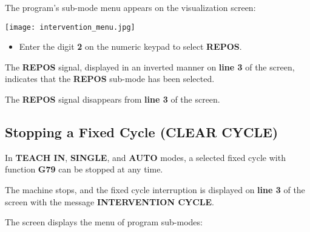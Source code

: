 \begin{itemize}
\end{itemize}

The program's sub-mode menu appears on the visualization screen:

\begin{center}
    \texttt{[image: intervention\_menu.jpg]}
\end{center}

\begin{itemize}
    \item Enter the digit \textbf{2} on the numeric keypad to select \textbf{REPOS}.
\end{itemize}

The \textbf{REPOS} signal, displayed in an inverted manner on \textbf{line 3} of the screen,  
indicates that the \textbf{REPOS} sub-mode has been selected.

\begin{itemize}
\end{itemize}

The \textbf{REPOS} signal disappears from \textbf{line 3} of the screen.

\newpage

\subsection{Stopping a Fixed Cycle (CLEAR CYCLE)}

In \textbf{TEACH IN}, \textbf{SINGLE}, and \textbf{AUTO} modes,  
a selected fixed cycle with function \textbf{G79} can be stopped at any time.

\procedure

\begin{itemize}
\end{itemize}

The machine stops, and the fixed cycle interruption is displayed  
on \textbf{line 3} of the screen with the message \textbf{INTERVENTION CYCLE}.

\begin{itemize}
\end{itemize}

The screen displays the menu of program sub-modes:

